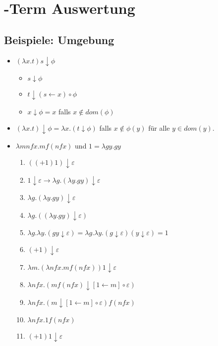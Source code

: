 \section{\lambda -Term Auswertung}

\subsection{Beispiele: Umgebung}
\begin{itemize}
    \item $(\lambda x.t) s \downarrow \phi$
    \begin{itemize}
        \item $s \downarrow \phi$
        \item $t \downarrow (s \leftarrow x) \circ \phi$
        \item $x \downarrow \phi = x$ falls $x \notin dom(\phi)$
    \end{itemize}

    \item $(\lambda x.t) \downarrow \phi = \lambda x.(t \downarrow \phi)$
    falls $x \notin \phi(y)$ für alle $y \in dom(y)$.

    \item $\lambda mnfx.mf(nfx)$ und $1 = \lambda gy.gy$
    \begin{enumerate}
        \item $((+ 1) 1) \downarrow \varepsilon$
        \item $1 \downarrow \varepsilon \rightarrow \lambda g.(\lambda y.gy) \downarrow \varepsilon$
        \item $\lambda g.(\lambda y.gy) \downarrow \varepsilon$
        \item $\lambda g.((\lambda y.gy) \downarrow \varepsilon)$
        \item $\lambda g.\lambda y.(gy \downarrow \varepsilon) = \lambda g.\lambda y.(g \downarrow \varepsilon)(y \downarrow \varepsilon) = 1$
        \item $(+ 1) \downarrow \varepsilon$
        \item $\lambda m.(\lambda nfx.mf(nfx)) 1 \downarrow \varepsilon$
        \item $\lambda nfx.(mf(nfx) \downarrow [1\leftarrow m] \circ \varepsilon)$
        \item $\lambda nfx.(m \downarrow [1\leftarrow m] \circ \varepsilon) f(nfx)$
        \item $\lambda nfx.1f(nfx)$
        \item $(+ 1) 1 \downarrow \varepsilon$
    \end{enumerate}
\end{itemize}
